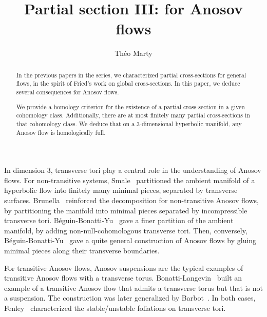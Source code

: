 \documentclass[colorinlistoftodos,12pt]{article}
\title{Partial section III: for Anosov flows}
\author{Théo Marty}
\date{}
\theoremstyle{colorplain}
\numberwithin{theorem}{section}
\theoremstyle{colorremarkbis}
\theoremstyle{colorremark}
\theoremstyle{colordefinition}
\begin{document}
\maketitle

\begin{abstract}
	In the previous papers in the series, we characterized partial cross-sections for general flows, in the spirit of Fried's work on global cross-sections. In this paper, we deduce several consequences for Anosov flows. 
	
	We provide a homology criterion for the existence of a partial cross-section in a given cohomology class.
	Additionally, there are at most finitely many partial cross-sections in that cohomology class. 
	We deduce that on a 3-dimensional hyperbolic manifold, any Anosov flow is homologically full.
\end{abstract}

In dimension 3, transverse tori play a central role in the understanding of Anosov flows. For non-transitive systems, Smale~\cite{smale1967differentiable} partitioned the ambient manifold of a hyperbolic flow into finitely many minimal pieces, separated by transverse surfaces. Brunella~\cite{brunella1993separating} reinforced the decomposition for non-transitive Anosov flows, by partitioning the manifold into minimal pieces separated by incompressible transverse tori. Béguin-Bonatti-Yu~\cite{beguin2016spectral} gave a finer partition of the ambient manifold, by adding non-null-cohomologous transverse tori. Then, conversely, Béguin-Bonatti-Yu~\cite{beguin2017building} gave a quite general construction of Anosov flows by gluing minimal pieces along their transverse boundaries.

For transitive Anosov flows, Anosov suspensions are the typical examples of transitive Anosov flows with a transverse torus.
Bonatti-Langevin~\cite{bonatti1994exemple} built an example of a transitive Anosov flow that admits a transverse torus but that is not a suspension. The construction was later generalized by Barbot~\cite{barbot1998generalizations}. 
In both cases, Fenley~\cite{fenley1994anosov} characterized the stable/unstable foliations on transverse tori.
\end{document}

